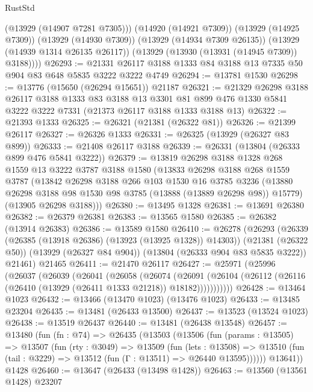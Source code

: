 \begin{lexlean}{RustStd}
\begin{coremodule}
          (@13929 (@14907 @7281 @7305)))
        (@14920 (@14921 @7309))
        (@13929 (@14925 @7309))
        (@13929 (@14930 @7309))
        (@13929 (@14934 @7309 @26135))
        (@13929 (@14939 @1314 @26135 @26117))
        (@13929 (@13930 (@13931 (@14945 @7309)) @3188))))
@26293 := @21331 @26117 @3188 @1333 @84 @3188 @13 @7335 @50 @904 @83 @648 @5835 @3222 @3222 @4749
@26294 := @13781 @1530
@26298 := @13776 (@15650 (@26294 @15651)) @21187
@26321 := @21329
    @26298
    @3188
    @26117
    @3188
    @1333
    @83
    @3188
    @13
    @3301
    @81
    @899
    @476
    @1330
    @5841
    @3222
    @3222
    @7331
    (@21373 @26117 @3188 @1333 @3188 @13)
@26322 := @21393 @1333
@26325 := @26321 (@21381 (@26322 @81))
@26326 := @21399 @26117
@26327 := @26326 @1333
@26331 := @26325 (@13929 (@26327 @83 @899))
@26333 := @21408 @26117 @3188
@26339 := @26331 (@13804 (@26333 @899 @476 @5841 @3222))
@26379 := @13819
    @26298
    @3188
    @1328
    @268
    @1559
    @13
    @3222
    @3787
    @3188
    @1580
    (@13833
      @26298
      @3188
      @268
      @1559
      @3787
      (@13842
        @26298
        @3188
        @266
        @103
        @1530
        @16
        @3785
        @3236
        (@13880 @26298 @3188 @98 @1530 @98 @3785 (@13888 (@13889 @26298 @98)) @15779)
        (@13905 @26298 @3188)))
@26380 := @13495 @1328
@26381 := @13691 @26380
@26382 := @26379 @26381
@26383 := @13565 @1580
@26385 := @26382 (@13914 @26383)
@26386 := @13589 @1580
@26410 := @26278
    (@26293
      (@26339 (@26385 (@13918 @26386) (@13923 (@13925 @1328)) @14303))
      (@21381 (@26322 @50))
      (@13929 (@26327 @84 @904))
      (@13804 (@26333 @904 @83 @5835 @3222))
      @21461)
    @21465
@26411 := @21470 @26117
@26427 := @25971
    (@25996
      (@26037
        (@26039
          (@26041
            (@26058
              (@26074
                (@26091
                  (@26104 (@26112 (@26116 (@26410 (@13929 (@26411 @1333 @21218)) @18182)))))))))))
@26428 := @13464 @1023
@26432 := @13466 (@13470 @1023) (@13476 @1023)
@26433 := @13485 @23204
@26435 := @13481 (@26433 @13500)
@26437 := @13523 (@13524 @1023)
@26438 := @13519 @26437
@26440 := @13481 (@26438 @13548)
@26457 := @13480
    (fun (fn : @74) =>
    @26435
      (@13503
        (@13506
          (fun (params : @13505) =>
          @13507
            (fun (rty : @3049) =>
            @13509
              (fun (lets : @13508) =>
              @13510 (fun (tail : @3229) => @13512 (fun (Γ : @13511) => @26440 @13595))))))
        @13641))
    @1428
@26460 := @13647 (@26433 (@13498 @1428))
@26463 := @13560 (@13561 @1428) @23207

\end{coremodule}
\end{lexlean}
